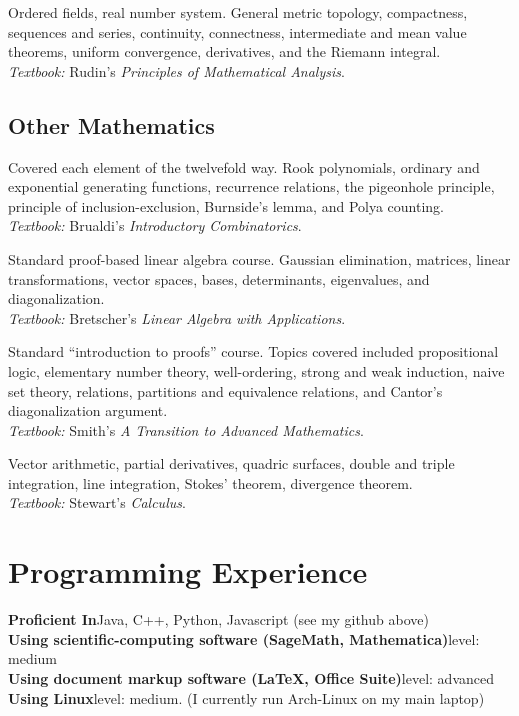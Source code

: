 \documentclass[11pt,letterpaper,sans]{moderncv}
\begin{document}
%
  {Ordered fields, real number system. General metric topology, compactness, sequences and series, continuity, connectness, intermediate and mean value theorems, uniform convergence, derivatives, and the Riemann integral. \\ \emph{Textbook: }Rudin's \emph{Principles of Mathematical Analysis}.}



\subsection{Other Mathematics}

%
  {Covered each element of the twelvefold way. Rook polynomials, ordinary and exponential generating functions, recurrence relations, the pigeonhole principle, principle of inclusion-exclusion, Burnside's lemma, and Polya counting.   \\ \emph{Textbook: }Brualdi's \emph{Introductory Combinatorics}.}

%
  {Standard proof-based linear algebra course. Gaussian elimination, matrices, linear transformations, vector spaces, bases, determinants, eigenvalues, and diagonalization.\\ \emph{Textbook: }Bretscher's \emph{Linear Algebra with Applications}.}

%
  {Standard ``introduction to proofs'' course. Topics covered included propositional logic, elementary number theory, well-ordering, strong and weak induction, naive set theory, relations, partitions and equivalence relations, and Cantor's diagonalization argument. \\ \emph{Textbook: }Smith's \emph{A Transition to Advanced Mathematics}.}

%
  {Vector arithmetic, partial derivatives, quadric surfaces, double and triple integration, line integration, Stokes' theorem, divergence theorem. \\ \emph{Textbook: }Stewart's \emph{Calculus}.}

\section{Programming Experience}
\textbf{Proficient In}\quad Java, C++, Python, Javascript (see my github above) \\
\textbf{Using scientific-computing software (SageMath, Mathematica)}\quad level: medium \\
\textbf{Using document markup software (\LaTeX, Office Suite)}\quad level: advanced \\
\textbf{Using Linux}\quad level: medium. (I currently run Arch-Linux on my main laptop)
\end{document}
